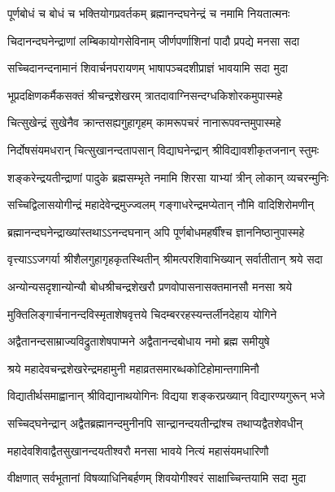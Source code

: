 \twolineshloka
{पूर्णबोधं च बोधं च भक्तियोगप्रवर्तकम्} 
{ब्रह्मानन्दघनेन्द्रं च नमामि नियतात्मनः}%

\twolineshloka
{चिदानन्दघनेन्द्राणां लम्बिकायोगसेविनाम्} 
{जीर्णपर्णाशिनां पादौ प्रपद्ये मनसा सदा}%

\twolineshloka
{सच्चिदानन्दनामानं शिवार्चनपरायणम्} 
{भाषापञ्चदशीप्राज्ञं भावयामि सदा मुदा}%

\twolineshloka
{भूप्रदक्षिणकर्मैकसक्तं श्रीचन्द्रशेखरम्} 
{त्रातदावाग्निसन्दग्धकिशोरकमुपास्महे}%

\twolineshloka
{चित्सुखेन्द्रं सुखेनैव क्रान्तसह्यगुहागृहम्} 
{कामरूपचरं नानारूपवन्तमुपास्महे}%

\twolineshloka
{निर्दोषसंयमधरान् चित्सुखानन्दतापसान्}
{विद्याघनेन्द्रान् श्रीविद्यावशीकृतजनान् स्तुमः}

\twolineshloka
{शङ्करेन्द्रयतीन्द्राणां पादुके ब्रह्मसम्भृते} 
{नमामि शिरसा याभ्यां त्रीन् लोकान् व्यचरन्मुनिः}%

\twolineshloka
{सच्चिद्विलासयोगीन्द्रं महादेवेन्द्रमुज्ज्वलम्}
{गङ्गाधरेन्द्रमप्येतान् नौमि वादिशिरोमणीन्}

\twolineshloka
{ब्रह्मानन्दघनेन्द्राख्यांस्तथाऽऽनन्दघनान् अपि} 
{पूर्णबोधमहर्षींश्च ज्ञाननिष्ठानुपास्महे} %

\twolineshloka
{वृत्त्याऽऽजगर्या श्रीशैलगुहागृहकृतस्थितीन्} 
{श्रीमत्परशिवाभिख्यान् सर्वातीतान् श्रये सदा}%

\twolineshloka
{अन्योन्यसदृशान्योन्यौ बोधश्रीचन्द्रशेखरौ} 
{प्रणवोपासनासक्तमानसौ मनसा श्रये}%

\twolineshloka
{मुक्तिलिङ्गार्चनानन्दविस्मृताशेषवृत्तये} 
{चिदम्बररहस्यन्तर्लीनदेहाय योगिने}%

\twolineshloka
{अद्वैतानन्दसाम्राज्यविद्रुताशेषपाप्मने} 
{अद्वैतानन्दबोधाय नमो ब्रह्म समीयुषे}%

\twolineshloka
{श्रये महादेवचन्द्रशेखरेन्द्रमहामुनी} 
{महाव्रतसमारब्धकोटिहोमान्तगामिनौ}%

\twolineshloka
{विद्यातीर्थसमाह्वानान् श्रीविद्यानाथयोगिनः} 
{विद्यया शङ्करप्रख्यान् विद्यारण्यगुरून् भजे}%

\twolineshloka
{सच्चिद्घनेन्द्रान् अद्वैतब्रह्मानन्दमुनीनपि} 
{सान्द्रानन्दयतीन्द्रांश्च तथाप्यद्वैतशेवधीन्}%

\twolineshloka
{महादेवशिवाद्वैतसुखानन्दयतीश्वरौ} 
{मनसा भावये नित्यं महासंयमधारिणौ}%

\twolineshloka
{वीक्षणात् सर्वभूतानां विषव्याधिनिबर्हणम्} 
{शिवयोगीश्वरं साक्षाच्चिन्तयामि सदा मुदा}%

